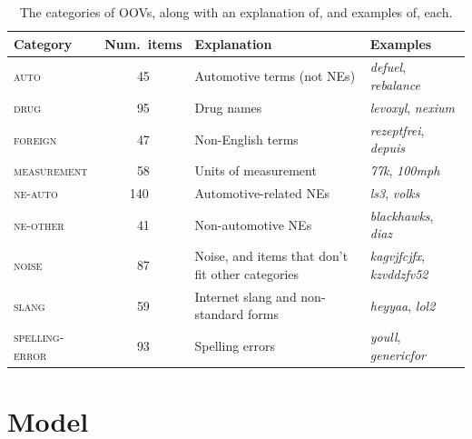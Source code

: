 \documentclass[10pt, a4paper]{article}
\begin{document}
\begin{table}
\begin{center}
\begin{tabular}{lcll}

 Category & Num.\ items & Explanation & Examples \\ \hline

 \textsc{auto} & 45 & Automotive terms (not NEs) & \emph{defuel}, \emph{rebalance} \\

 \textsc{drug} & 95 & Drug names & \emph{levoxyl}, \emph{nexium} \\

 \textsc{foreign} & 47 &  Non-English terms & \emph{rezeptfrei}, \emph{depuis}\\%

 \textsc{measurement}& 58 & Units of measurement & \emph{77k}, \emph{100mph} \\

 \textsc{ne-auto}& 140~\, & Automotive-related NEs & \emph{ls3}, \emph{volks} \\

 \textsc{ne-other}& 41& Non-automotive NEs & \emph{blackhawks}, \emph{diaz} \\

 \textsc{noise} & 87  & Noise, and items that don't fit other
 categories & \emph{kagvjfcjfx}, \emph{kzvddzfv52} \\

 \textsc{slang}& 59 & Internet slang and non-standard forms & \emph{heyyaa}, \emph{lol2}\\ %

 \textsc{spelling-error}& 93 & Spelling errors & \emph{youll}, \emph{genericfor} \\

\end{tabular}
\caption{The categories of OOVs, along with an explanation of, and
  examples of, each.\label{tbl:categories}}
\end{center}
\end{table}

\section{Model}

\end{document}
